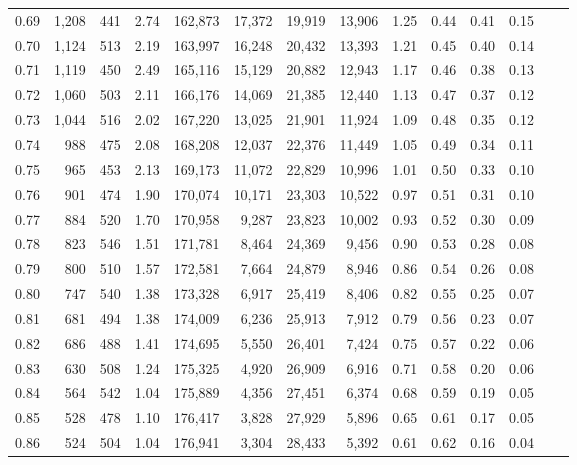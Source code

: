 \begin{tabular}{rrrrrrrrrrrrrr}
0.69 &  1,208 &  441 &    2.74 &  162,873 &   17,372 &  19,919 &  13,906 &  1.25 &  0.44 &  0.41 &      0.15 \\
0.70 &  1,124 &  513 &    2.19 &  163,997 &   16,248 &  20,432 &  13,393 &  1.21 &  0.45 &  0.40 &      0.14 \\
0.71 &  1,119 &  450 &    2.49 &  165,116 &   15,129 &  20,882 &  12,943 &  1.17 &  0.46 &  0.38 &      0.13 \\
0.72 &  1,060 &  503 &    2.11 &  166,176 &   14,069 &  21,385 &  12,440 &  1.13 &  0.47 &  0.37 &      0.12 \\
0.73 &  1,044 &  516 &    2.02 &  167,220 &   13,025 &  21,901 &  11,924 &  1.09 &  0.48 &  0.35 &      0.12 \\
0.74 &    988 &  475 &    2.08 &  168,208 &   12,037 &  22,376 &  11,449 &  1.05 &  0.49 &  0.34 &      0.11 \\
0.75 &    965 &  453 &    2.13 &  169,173 &   11,072 &  22,829 &  10,996 &  1.01 &  0.50 &  0.33 &      0.10 \\
0.76 &    901 &  474 &    1.90 &  170,074 &   10,171 &  23,303 &  10,522 &  0.97 &  0.51 &  0.31 &      0.10 \\
0.77 &    884 &  520 &    1.70 &  170,958 &    9,287 &  23,823 &  10,002 &  0.93 &  0.52 &  0.30 &      0.09 \\
0.78 &    823 &  546 &    1.51 &  171,781 &    8,464 &  24,369 &   9,456 &  0.90 &  0.53 &  0.28 &      0.08 \\
0.79 &    800 &  510 &    1.57 &  172,581 &    7,664 &  24,879 &   8,946 &  0.86 &  0.54 &  0.26 &      0.08 \\
0.80 &    747 &  540 &    1.38 &  173,328 &    6,917 &  25,419 &   8,406 &  0.82 &  0.55 &  0.25 &      0.07 \\
0.81 &    681 &  494 &    1.38 &  174,009 &    6,236 &  25,913 &   7,912 &  0.79 &  0.56 &  0.23 &      0.07 \\
0.82 &    686 &  488 &    1.41 &  174,695 &    5,550 &  26,401 &   7,424 &  0.75 &  0.57 &  0.22 &      0.06 \\
0.83 &    630 &  508 &    1.24 &  175,325 &    4,920 &  26,909 &   6,916 &  0.71 &  0.58 &  0.20 &      0.06 \\
0.84 &    564 &  542 &    1.04 &  175,889 &    4,356 &  27,451 &   6,374 &  0.68 &  0.59 &  0.19 &      0.05 \\
0.85 &    528 &  478 &    1.10 &  176,417 &    3,828 &  27,929 &   5,896 &  0.65 &  0.61 &  0.17 &      0.05 \\
0.86 &    524 &  504 &    1.04 &  176,941 &    3,304 &  28,433 &   5,392 &  0.61 &  0.62 &  0.16 &      0.04 \\

\end{tabular}
